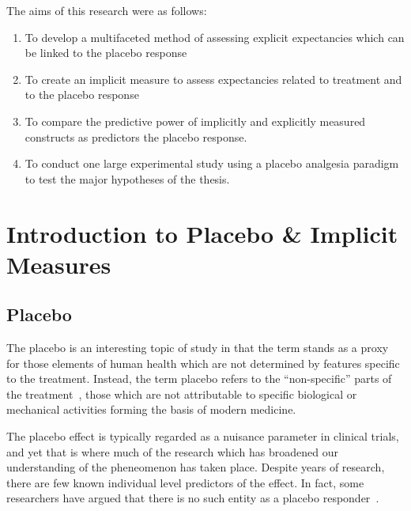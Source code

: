 The aims of this research were as follows:


\begin{enumerate}


\item To develop a multifaceted method of assessing explicit expectancies which can be linked to the placebo response

\item To create an implicit measure to assess expectancies related to treatment and to the placebo response

\item To compare the predictive power of implicitly and explicitly measured constructs as predictors the placebo response. 

\item To conduct one large experimental study using a placebo analgesia paradigm to test the major hypotheses of the thesis.


\end{enumerate}


\section{Introduction to Placebo \& Implicit Measures}
\label{sec:intr-plac-impl-meas}

\subsection{Placebo}
\label{sec:placebo}

The placebo is an interesting topic of study in that the term stands as a proxy for those elements of human health which are not determined by  features specific to the treatment. Instead, the term placebo refers to the ``non-specific'' parts of the treatment~\cite{grunbaum1981placebo}, those which are not attributable to  specific biological or mechanical activities forming the basis of modern medicine. 

The placebo effect is typically regarded as a nuisance parameter in clinical trials, and yet that is where much of the research which has broadened our understanding of the pheneomenon has taken place.
Despite years of research, there are few known individual level predictors of the effect. In fact, some researchers have argued that there is no such entity as a placebo responder~\cite{Kaptchuk2008a}. 



